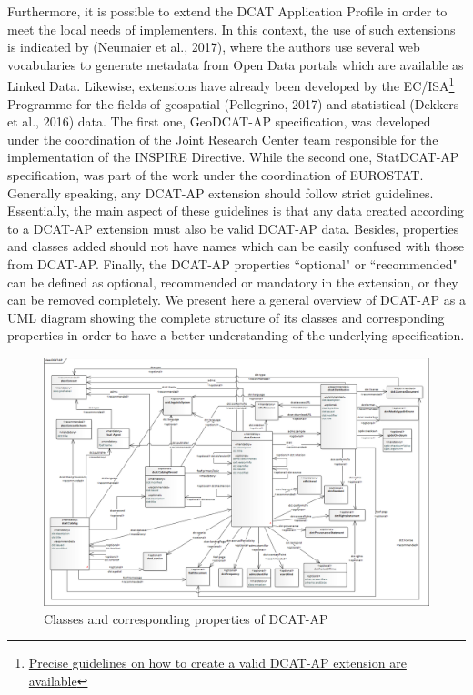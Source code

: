 \documentclass[<options>]{elsarticle}
\begin{document}
Furthermore, it is possible to extend the DCAT Application Profile in order to meet the local needs of implementers. In this context, the use of such extensions is indicated by (Neumaier et al., 2017), where the authors use several web vocabularies to generate metadata from Open Data portals which are available as Linked Data. Likewise, extensions have already been developed by the EC/ISA\footnote{\href{https://joinup.ec.europa.eu/node/150345/}{Precise guidelines on how to create a valid DCAT-AP extension are available}} Programme for the fields of geospatial (Pellegrino, 2017) and statistical (Dekkers et al., 2016) data. The first one, GeoDCAT-AP specification, was developed under the coordination of the Joint Research Center team responsible for the implementation of the INSPIRE Directive. While the second one, StatDCAT-AP specification, was part of the work under the coordination of EUROSTAT. Generally speaking, any DCAT-AP extension should follow strict guidelines. Essentially, the main aspect of these guidelines is that any data created according to a DCAT-AP extension must also be valid DCAT-AP data. Besides, properties and classes added should not have names which can be easily confused with those from DCAT-AP. Finally, the DCAT-AP properties ``optional" or ``recommended" can be defined as optional, recommended or mandatory in the extension, or they can be removed completely. We present here a general overview of DCAT-AP as a UML diagram showing the complete structure of its classes and corresponding properties in order to have a better understanding of the underlying specification.

\begin{figure}[H]
\includegraphics[width=1.3\textwidth]{DCAT-AP.png}
\caption{Classes and corresponding properties of DCAT-AP}
\label{dcat-ap}
\end{figure}
\end{document}
